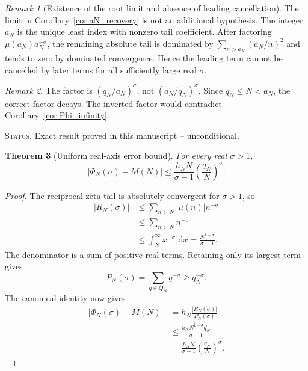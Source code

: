 \documentclass[11pt]{amsart}
\numberwithin{equation}{section}
\theoremstyle{plain}
\newtheorem{theorem}{Theorem}[section]
\theoremstyle{definition}
\theoremstyle{remark}
\newtheorem{remark}[theorem]{Remark}
\newcommand{\1}{\mathbf{1}}
\newcommand{\dd}{\,\mathrm{d}}
\newcommand{\statusnote}[1]{%
  \par\smallskip\noindent
  \begingroup\footnotesize\textsc{Status.} #1\endgroup
  \par\smallskip}
\begin{document}
\begin{remark}[Existence of the root limit and absence of leading cancellation]
\label{rem:aN_no_cancellation}
The limit in Corollary~\ref{cor:aN_recovery} is not an additional
hypothesis.  The integer $a_N$ is the unique least index with nonzero tail
coefficient.  After factoring $\mu(a_N)a_N^{-\sigma}$, the remaining
absolute tail is dominated by $\sum_{n>a_N}(a_N/n)^2$ and tends to zero by
dominated convergence.  Hence the leading term cannot be cancelled by later
terms for all sufficiently large real $\sigma$.
\end{remark}

\begin{remark}
\label{rem:orientation_growth}
The factor is \((q_N/a_N)^\sigma\), not
\((a_N/q_N)^\sigma\).  Since \(q_N\leq N<a_N\), the correct factor
decays.  The inverted factor would contradict
Corollary~\ref{cor:Phi_infinity}.
\end{remark}

\statusnote{Exact result proved in this manuscript -- unconditional.}
\begin{theorem}[Uniform real-axis error bound]
\label{thm:rounding_bound}
For every real \(\sigma>1\),
\begin{equation}
\boxed{
|\Phi_N(\sigma)-M(N)|
\leq
\frac{h_NN}{\sigma-1}
\left(\frac{q_N}{N}\right)^\sigma.
}
\label{eq:rounding_bound}
\end{equation}
\end{theorem}

\begin{proof}
The reciprocal-zeta tail is absolutely convergent for \(\sigma>1\), so
\begin{align}
|R_N(\sigma)|
&\leq
\sum_{n>N}|\mu(n)|n^{-\sigma}
\label{eq:rounding_abs_mu}
\\
&\leq
\sum_{n>N}n^{-\sigma}
\label{eq:rounding_drop_mu}
\\
&\leq
\int_N^\infty x^{-\sigma}\,\dd x
=
\frac{N^{1-\sigma}}{\sigma-1}.
\label{eq:rounding_integral_detailed}
\end{align}
The denominator is a sum of positive real terms.  Retaining only its
largest term gives
\begin{equation}
P_N(\sigma)
=
\sum_{q\in Q_N}q^{-\sigma}
\geq
q_N^{-\sigma}.
\label{eq:rounding_P_positive}
\end{equation}
The canonical identity now gives
\begin{align}
|\Phi_N(\sigma)-M(N)|
&=
h_N\frac{|R_N(\sigma)|}{P_N(\sigma)}
\label{eq:rounding_identity_use}
\\
&\leq
\frac{h_NN^{1-\sigma}q_N^\sigma}{\sigma-1}
\label{eq:rounding_combine}
\\
&=
\frac{h_NN}{\sigma-1}
\left(\frac{q_N}{N}\right)^\sigma.
\label{eq:rounding_final_detailed}
\end{align}
\end{proof}
\end{document}
